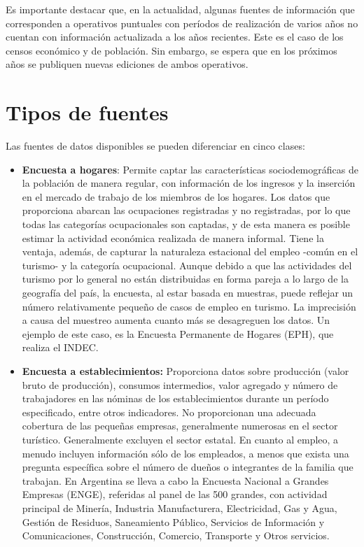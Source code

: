 \documentclass[
  openany]{book}
\begin{document}
Es importante destacar que, en la actualidad, algunas fuentes de información que corresponden a operativos puntuales con períodos de realización de varios años no cuentan con información actualizada a los años recientes. Este es el caso de los censos económico y de población. Sin embargo, se espera que en los próximos años se publiquen nuevas ediciones de ambos operativos.

\hypertarget{tipos-de-fuentes}{%
\section{Tipos de fuentes}\label{tipos-de-fuentes}}

Las fuentes de datos disponibles se pueden diferenciar en cinco clases:

\begin{itemize}
\item
  \textbf{Encuesta a hogares}: Permite captar las características sociodemográficas de la población de manera regular, con información de los ingresos y la inserción en el mercado de trabajo de los miembros de los hogares.
  Los datos que proporciona abarcan las ocupaciones registradas y no registradas, por lo que todas las categorías ocupacionales son captadas, y de esta manera es posible estimar la actividad económica realizada de manera informal.
  Tiene la ventaja, además, de capturar la naturaleza estacional del empleo -común en el turismo- y la categoría ocupacional.
  Aunque debido a que las actividades del turismo por lo general no están distribuidas en forma pareja a lo largo de la geografía del país, la encuesta, al estar basada en muestras, puede reflejar un número relativamente pequeño de casos de empleo en turismo.
  La imprecisión a causa del muestreo aumenta cuanto más se desagreguen los datos.
  Un ejemplo de este caso, es la Encuesta Permanente de Hogares (EPH), que realiza el INDEC.
\item
  \textbf{Encuesta a establecimientos:} Proporciona datos sobre producción (valor bruto de producción), consumos intermedios, valor agregado y número de trabajadores en las nóminas de los establecimientos durante un período especificado, entre otros indicadores.
  No proporcionan una adecuada cobertura de las pequeñas empresas, generalmente numerosas en el sector turístico.
  Generalmente excluyen el sector estatal.
  En cuanto al empleo, a menudo incluyen información sólo de los empleados, a menos que exista una pregunta específica sobre el número de dueños o integrantes de la familia que trabajan.
  En Argentina se lleva a cabo la Encuesta Nacional a Grandes Empresas (ENGE), referidas al panel de las 500 grandes, con actividad principal de Minería, Industria Manufacturera, Electricidad, Gas y Agua, Gestión de Residuos, Saneamiento Público, Servicios de Información y Comunicaciones, Construcción, Comercio, Transporte y Otros servicios.

\end{itemize}
\end{document}
